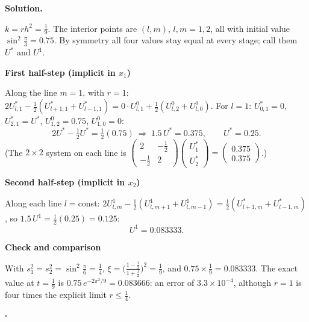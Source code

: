 \documentclass[11pt,a4paper]{article}
\newenvironment{solution}
  {\par\noindent\textbf{Solution.}\par\nobreak}
  {\par\nobreak\noindent\hfill\(\square\)\par}
\newcommand{\step}[1]{\par\addvspace{0.5em}\noindent\textbf{#1}\par\nobreak}
\begin{document}
\begin{solution}
\(k=rh^2=\frac19\).  The interior points are \((l,m)\), \(l,m=1,2\), all
with initial value \(\sin^2\frac\pi3=0.75\).  By symmetry all four
values stay equal at every stage; call them \(U^*\) and \(U^1\).

\step{First half-step (implicit in \(x_1\))}
Along the line \(m=1\), with \(r=1\):
\(2U_{l,1}^*-\frac12(U_{l+1,1}^*+U_{l-1,1}^*)=0\cdot U_{l,1}^0+\frac12(U_{l,2}^0+U_{l,0}^0)\).
For \(l=1\): \(U_{0,1}^*=0\), \(U_{2,1}^*=U^*\), \(U_{1,2}^0=0.75\),
\(U_{1,0}^0=0\):
\[
  2U^*-\tfrac12U^*=\tfrac12(0.75)\ \Longrightarrow\ 1.5\,U^*=0.375,
  \qquad U^*=0.25 .
\]
(The \(2\times2\) system on each line is
\(\begin{pmatrix}2&-\frac12\\-\frac12&2\end{pmatrix}\begin{pmatrix}U_{1}^*\\U_{2}^*\end{pmatrix}
=\begin{pmatrix}0.375\\0.375\end{pmatrix}\).)

\step{Second half-step (implicit in \(x_2\))}
Along each line \(l=\)const:
\(2U_{l,m}^1-\frac12(U_{l,m+1}^1+U_{l,m-1}^1)=\frac12(U_{l+1,m}^*+U_{l-1,m}^*)\),
so \(1.5\,U^1=\frac12(0.25)=0.125\):
\[
  U^1=0.083333 .
\]

\step{Check and comparison}
With \(s_1^2=s_2^2=\sin^2\frac\pi6=\frac14\),
\(\xi=\bigl(\frac{1-\frac12}{1+\frac12}\bigr)^2=\frac19\), and
\(0.75\times\frac19=0.083333\).  The exact value at \(t=\frac19\) is
\(0.75\,e^{-2\pi^2/9}=0.083666\): an error of \(3.3\times10^{-4}\), although
\(r=1\) is four times the explicit limit \(r\le\frac14\).
\end{solution}
\end{document}
